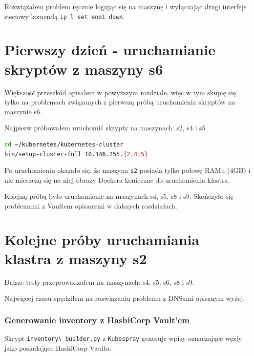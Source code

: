 \documentclass[a4paper,12pt,twoside,openany]{report}
\newcommand{\passthrough}[1]{#1}
\begin{document}
Rozwiązałem problem ręcznie logując się na maszynę i wyłączając drugi
interfejs sieciowy komendą \passthrough{\lstinline!ip l set eno1 down!}.

\hypertarget{pierwszy-dzieux144---uruchamianie-skryptuxf3w-z-maszyny-s6}{%
\section{Pierwszy dzień - uruchamianie skryptów z maszyny
s6}\label{pierwszy-dzieux144---uruchamianie-skryptuxf3w-z-maszyny-s6}}

Większość przeszkód opisałem w powyższym rozdziale, więc w tym skupię
się tylko na problemach związanych z pierwszą próbą uruchomienia
skryptów na maszynie s6.

Najpierw próbowałem uruchomić skrypty na maszynach: s2, s4 i s5

\begin{lstlisting}[language=bash]
cd ~/kubernetes/kubernetes-cluster
bin/setup-cluster-full 10.146.255.{2,4,5}
\end{lstlisting}

Po uruchomieniu okazało się, że maszyna \passthrough{\lstinline!s2!}
posiada tylko połowę RAMu (4GB) i nie mieszczą się na niej obrazy
Dockera konieczne do uruchomienia klastra.

Kolejną próbą było uruchomienie na maszynach s4, s5, s8 i s9. Skończyło
się problemami z Vaultem opisanymi w dalszych rozdziałach.

\hypertarget{kolejne-pruxf3by-uruchamiania-klastra-z-maszyny-s2}{%
\section{Kolejne próby uruchamiania klastra z maszyny
s2}\label{kolejne-pruxf3by-uruchamiania-klastra-z-maszyny-s2}}

Dalsze testy przeprowadzałem na maszynach: s4, s5, s6, s8 i s9.

Najwięcej czasu spędziłem na rozwiązaniu problemu z DNSami opisanym
wyżej.

\hypertarget{generowanie-inventory-z-hashicorp-vaultem}{%
\subsubsection{Generowanie inventory z HashiCorp
Vault'em}\label{generowanie-inventory-z-hashicorp-vaultem}}

Skrypt \passthrough{\lstinline!inventory\_builder.py!} z
\passthrough{\lstinline!Kubespray!} generuje wpisy oznaczające węzły
jako posiadające HashiCorp Vaulta.
\end{document}
